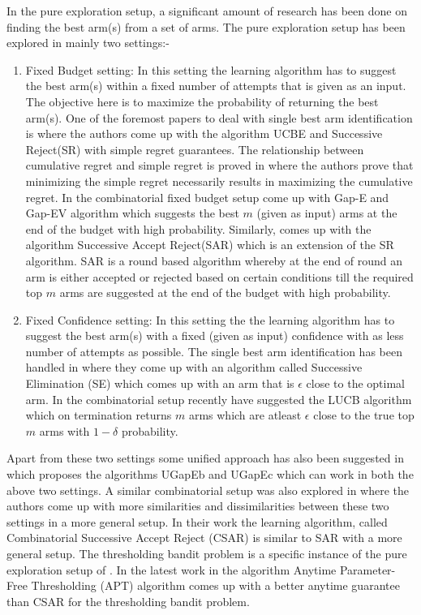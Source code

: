	In the pure exploration setup, a significant amount of research has been done on finding the best arm(s) from a set of arms. The pure exploration setup has been explored in mainly two settings:-
\begin{enumerate}
\item Fixed Budget setting: In this setting the learning algorithm has to suggest the best arm(s) within a fixed number of attempts that is given as an input. The objective here is to maximize the probability of returning the best arm(s). One of the foremost papers to deal with single best arm identification is \cite{audibert2009exploration} where the authors come up with the algorithm UCBE and Successive Reject(SR) with simple regret guarantees. The relationship between cumulative regret and simple regret is proved in \cite{bubeck2011pure} where the authors prove that minimizing the simple regret necessarily results in maximizing the cumulative regret. In the combinatorial fixed budget setup \cite{gabillon2011multi} come up with Gap-E and Gap-EV algorithm which suggests the best $m$ (given as input) arms at the end of the budget with high probability. Similarly, \cite{bubeck2013multiple} comes up with the algorithm Successive Accept Reject(SAR) which is an extension of the SR algorithm. SAR is a round based algorithm whereby at the end of round an arm is either accepted or rejected based on certain conditions till the required top $m$ arms are suggested at the end of the budget with high probability. 
\item Fixed Confidence setting: In this setting the the learning algorithm has to suggest the best arm(s) with a fixed (given as input) confidence with as less number of attempts as possible. The single best arm identification has been handled in \cite{even2006action} where they come up with an algorithm called Successive Elimination (SE) which comes up with an arm that is $\epsilon$ close to the optimal arm. In the combinatorial setup recently \cite{kalyanakrishnan2012pac} have suggested the LUCB algorithm which on termination returns $m$ arms which are atleast $\epsilon$ close to the true top $m$ arms with $1-\delta$ probability.
\end{enumerate}	

	Apart from these two settings some unified approach has also been suggested in \cite{gabillon2012best} which proposes the algorithms UGapEb and UGapEc which can work in both the above two settings. A similar combinatorial setup was also explored in \cite{chen2014combinatorial} where the authors come up with more similarities and dissimilarities between these two settings in a more general setup. In their work the learning algorithm, called Combinatorial Successive Accept Reject (CSAR) is similar to SAR with a more general setup. The thresholding bandit problem is a specific instance of the pure exploration setup of \cite{chen2014combinatorial}. In the latest work in \cite{locatelli2016optimal} the algorithm Anytime Parameter-Free Thresholding (APT) algorithm comes up with a better anytime guarantee than CSAR for the thresholding bandit problem.